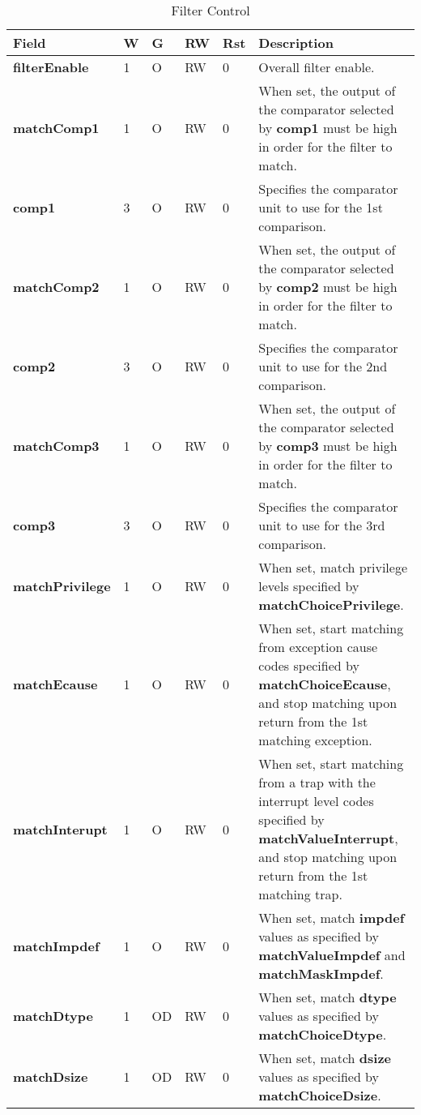 \begin{table}[htp]
  \centering
  \caption{Filter Control}
  \label{tab:ctl-filter}
  \begin{tabulary}{\textwidth}{|l|l|l|l|l|p{80mm}|}
    \hline
    {\bf Field} & {\bf W} & {\bf G} & {\bf RW} & {\bf Rst} & {\bf Description} \\
    \hline
    \textbf{filterEnable} & 1 & O & RW & 0 & Overall filter enable.\\
    \hline
    \textbf{matchComp1} & 1 & O & RW & 0 & When set, the output of the comparator selected by \textbf{comp1} must be high in order for the filter to match.\\
    \hline
    \textbf{comp1} & 3 & O & RW & 0 & Specifies the comparator unit to use for the 1st comparison.\\
    \hline
    \textbf{matchComp2} & 1 & O & RW & 0 & When set, the output of the comparator selected by \textbf{comp2} must be high in order for the filter to match.\\
    \hline
    \textbf{comp2} & 3 & O & RW & 0 & Specifies the comparator unit to use for the 2nd comparison.\\
    \hline
    \textbf {matchComp3} & 1 & O & RW & 0 & When set, the output of the comparator selected by \textbf{comp3} must be high in order for the filter to match.\\
    \hline
    \textbf{comp3} & 3 & O & RW & 0 & Specifies the comparator unit to use for the 3rd comparison.\\
    \hline
    \textbf{matchPrivilege} & 1 & O & RW & 0 & When set, match privilege levels specified by \textbf{matchChoicePrivilege}.\\
    \hline
    \textbf{matchEcause} & 1 & O & RW & 0 & When set, start matching from exception cause codes specified by \textbf{matchChoiceEcause}, 
      and stop matching upon return from the 1st matching exception.\\
    \textbf{matchInterupt} & 1 & O & RW & 0 & When set, start matching from a trap with the interrupt level codes specified by \textbf{matchValueInterrupt}, 
      and stop matching upon return from the 1st matching trap.\\
    \hline
    \textbf{matchImpdef} & 1 & O & RW & 0 & When set, match \textbf{impdef} values as specified by \textbf{matchValueImpdef} and \textbf{matchMaskImpdef}.\\
    \hline
    \textbf{matchDtype} & 1 & OD & RW & 0 & When set, match \textbf{dtype} values as specified by \textbf{matchChoiceDtype}.\\
    \hline
    \textbf{matchDsize} & 1 & OD & RW & 0 & When set, match \textbf{dsize} values as specified by \textbf{matchChoiceDsize}.\\
    \hline
  \end{tabulary}
\end{table}

